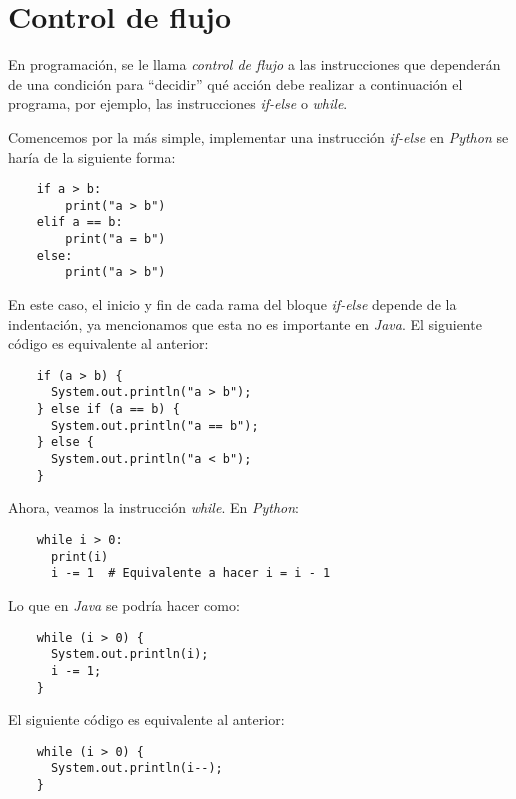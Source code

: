 \section{Control de flujo}
  En programación, se le llama \textit{control de flujo} a las instrucciones que 
  dependerán de una condición para ``decidir'' qué acción debe realizar a continuación el 
  programa, por ejemplo, las instrucciones \textit{if-else} o \textit{while}.

  Comencemos por la más simple, implementar una instrucción \textit{if-else} en 
  \textit{Python} se haría de la siguiente forma:

  \begin{verbatim}
    if a > b:
        print("a > b")
    elif a == b:
        print("a = b")
    else:
        print("a > b")
  \end{verbatim}

  En este caso, el inicio y fin de cada rama del bloque \textit{if-else} depende de la 
  indentación, ya mencionamos que esta no es importante en \textit{Java}.
  El siguiente código es equivalente al anterior:

  \begin{verbatim}
    if (a > b) {
      System.out.println("a > b");
    } else if (a == b) {
      System.out.println("a == b");
    } else {
      System.out.println("a < b");
    }
  \end{verbatim}

  Ahora, veamos la instrucción \textit{while}.
  En \textit{Python}:

  \begin{verbatim}
    while i > 0:
      print(i)
      i -= 1  # Equivalente a hacer i = i - 1
  \end{verbatim}

  Lo que en \textit{Java} se podría hacer como:

  \begin{verbatim}
    while (i > 0) {
      System.out.println(i);
      i -= 1;
    }
  \end{verbatim}

  El siguiente código es equivalente al anterior:
  
  \begin{verbatim}
    while (i > 0) {
      System.out.println(i--);
    }  
  \end{verbatim}

